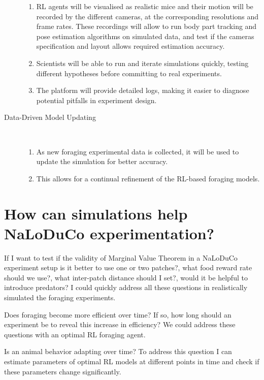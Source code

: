 \documentclass{article}
\begin{document}
\begin{description}
\begin{enumerate}
            \item RL agents will be visualised as realistic mice and their
                motion will be recorded by the different cameras, at the
                corresponding resolutions and frame rates. These recordings
                will allow to run body part tracking and pose estimation
                algorithms on simulated data, and test if the cameras
                specification and layout allows required estimation
                accuracy.

            \item Scientists will be able to run and iterate simulations
                quickly, testing different hypotheses before committing to real
                experiments.

            \item The platform will provide detailed logs, making it easier to
                diagnose potential pitfalls in experiment design.

        \end{enumerate}

    \item[Data-Driven Model Updating]\leavevmode\\
        \begin{enumerate}

            \item As new foraging experimental data is collected, it will be
                used to update the simulation for better accuracy.

            \item This allows for a continual refinement of the RL-based
                foraging models.

        \end{enumerate}

\end{description}

\section{How can simulations help NaLoDuCo experimentation?}

If I want to test if the validity of Marginal Value Theorem in a NaLoDuCo
experiment setup is it better to use one or two patches?, what food reward rate
should we use?, what inter-patch distance should I set?, would it be helpful to
introduce predators? I could quickly address all these questions in realistically
simulated the foraging experiments.

Does foraging become more efficient over time? If so, how long should an
experiment be to reveal this increase in efficiency? We could address these
questions with an optimal RL foraging agent.

Is an animal behavior adapting over time? To address this question I can
estimate parameters of optimal RL models at different points in time and check
if these parameters change significantly.
\end{document}
